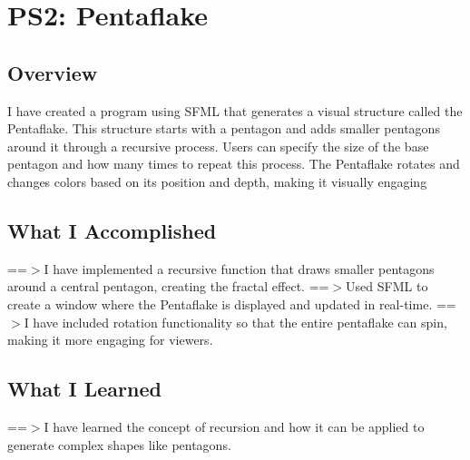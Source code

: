 \documentclass[12pt]{article}
\begin{document}
\newpage

\newpage
\section{PS2: Pentaflake}
\subsection{Overview}
I have created a program using SFML that generates a visual structure called the Pentaflake. This structure starts with a pentagon and adds smaller pentagons around it through a recursive process. Users can specify the size of the base pentagon and how many times to repeat this process. The Pentaflake rotates and changes colors based on its position and depth, making it visually engaging
\subsection{What I Accomplished}
==$>$I have implemented a recursive function that draws smaller pentagons around a central pentagon, creating the fractal effect.
\newline
==$>$Used SFML to create a window where the Pentaflake is displayed and updated in real-time.
\newline
==$>$I have included rotation functionality so that the entire pentaflake can spin, making it more engaging for viewers.
\subsection{What I Learned}
==$>$I have learned the concept of recursion and how it can be applied to generate complex shapes like pentagons.
\end{document}
